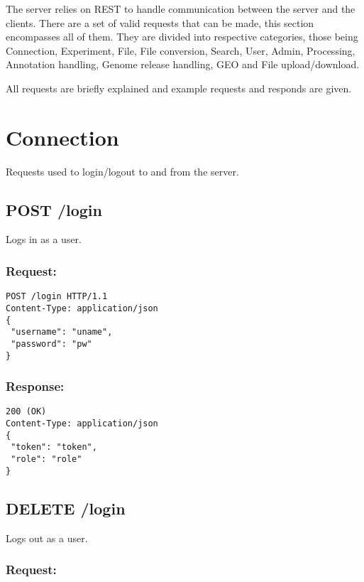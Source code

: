 \label{chap:com_api}

The server relies on REST to handle communication between the server and the clients. There are a set of valid requests that can be made, this section encompasses all of them. They are divided into respective categories, those being Connection, Experiment, File, File conversion, Search, User, Admin, Processing, Annotation handling, Genome release handling, GEO and File upload/download.

All requests are briefly explained and example requests and responds are given.

\section*{Connection}
Requests used to login/logout to and from the server.

\subsection*{POST /login}

Logs in as a user.

\subsubsection*{Request:}

\begin{verbatim}
POST /login HTTP/1.1
Content-Type: application/json
{
 "username": "uname", 
 "password": "pw"
}
\end{verbatim}

\subsubsection*{Response:}

\begin{verbatim}
200 (OK)
Content-Type: application/json
{
 "token": "token",
 "role": "role"
}
\end{verbatim}

\subsection*{DELETE /login}

Logs out as a user.

\subsubsection*{Request:}

